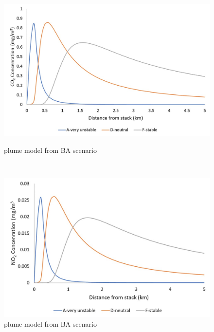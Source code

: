 \begin{figure}[h]
    \centering
    \begin{minipage}[t]{0.5\textwidth}
        \centering
        \includegraphics[width=\linewidth]{chapters/5-safety-layout-environment/figures/CO2plumeBA.jpg}
        \caption{ plume model from BA scenario}
        \label{fig:CO2plumeBA}
    \end{minipage}%
    ~ 
    \begin{minipage}[t]{0.5\textwidth}
        \centering
        \includegraphics[width=\linewidth]{chapters/5-safety-layout-environment/figures/NO2plumeBA.jpg}
        \caption{ plume model from BA scenario}
         \label{fig:NO2plumeBA}
    \end{minipage}
    
\end{figure}



